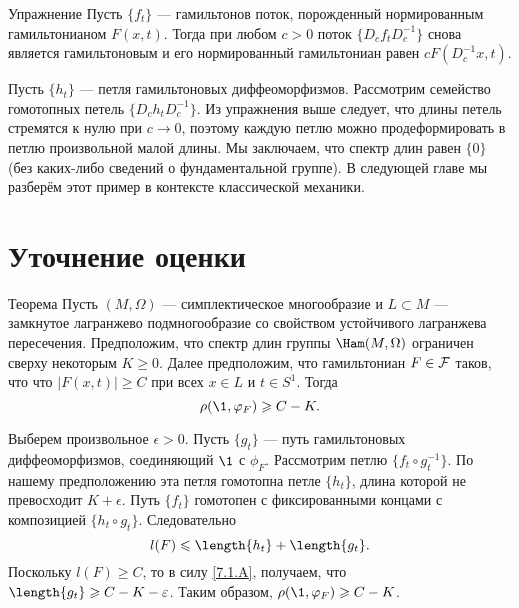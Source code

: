\begin{ex*}{Упражнение}
Пусть $\{f_t\}$ — гамильтонов поток, порожденный нормированным
гамильтонианом $F (x, t)$.
Тогда при любом $c> 0$ поток $\{D_c f_t D_c^{-1}\}$ снова является
гамильтоновым и его нормированный гамильтониан равен $cF (D_c^{-1} x, t)$.
\end{ex*}

Пусть $\{h_t\}$ — петля гамильтоновых диффеоморфизмов.
Рассмотрим семейство гомотопных петель $\{D_c h_t D_c ^{-1}\}$.
Из упражнения выше следует, что длины петель стремятся к нулю при $c \to 0$, поэтому каждую петлю можно продеформировать в петлю произвольной малой длины.
Мы заключаем, что спектр длин равен $\{0\}$ (без каких-либо сведений о фундаментальной группе).
В следующей главе мы разберём этот пример в контексте классической механики.

\section{Уточнение оценки}

\begin{thm}{Теорема}\label{7.4.A}
Пусть $(M, \Omega)$ — симплектическое многообразие и $L \subset M$
— замкнутое лагранжево подмногообразие со свойством устойчивого
лагранжева пересечения. 
Предположим, что спектр длин группы $\Ham (M, \Omega)$ ограничен
сверху некоторым $K \ge 0$. 
Далее предположим, что гамильтониан $F \in \mathcal{F}$ таков, что что $| F (x,
t) | \ge C$ при всех $x \in L$ и $t \in S^1$. 
Тогда 
\[\rho (\1, \phi_F) \ge C - K.\]
\end{thm}

Выберем произвольное $\epsilon> 0$. 
Пусть $\{g_t\}$ — путь гамильтоновых диффеоморфизмов, соединяющий $\1$ с $\phi_F$.
Рассмотрим петлю $\{f_t \circ g_t ^{-1}\}$.
По нашему предположению эта петля гомотопна петле $\{h_t\}$, длина которой не превосходит $K + \epsilon$.
Путь $\{f_t\}$ гомотопен с фиксированными концами с композицией $\{h_t \circ g_t\}$.
Следовательно
\[l (F) \le \length \{h_t\} + \length \{g_t\}.\]
Поскольку $l (F) \ge C$, то в силу \ref{7.1.A}, получаем, что $\length \{g_t\} \ge C \z- K - \epsilon$.
Таким образом, $\rho (\1, \phi_F) \ge C - K$.
\qeds
